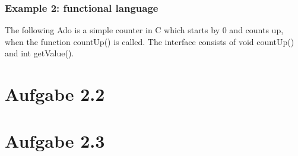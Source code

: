 \documentclass[a4paper,10pt]{scrartcl}[2003/01/01]
\begin{document}
\subsubsection*{Example 2: functional language}
The following Ado is a simple counter in C which starts by 0 and counts up, when the function countUp() is called. The interface consists of void countUp() and int getValue().



\section*{Aufgabe 2.2}

\section*{Aufgabe 2.3}
\end{document}
